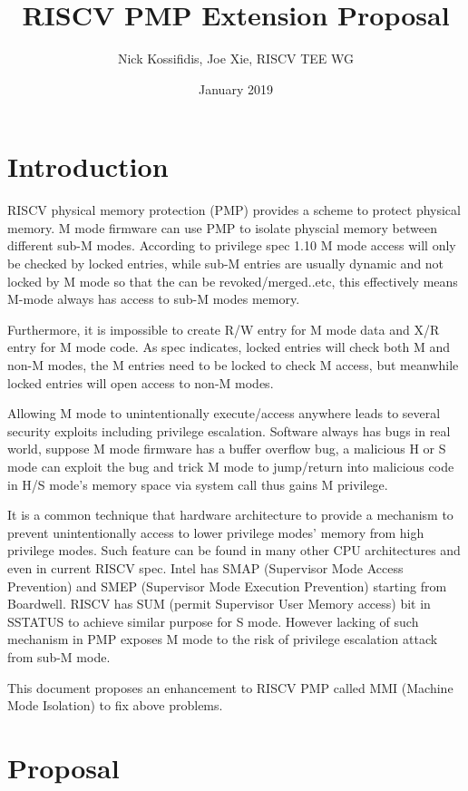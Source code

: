 \documentclass[twoside,11pt]{article}
\title{RISCV PMP Extension Proposal}
\author{Nick Kossifidis, Joe Xie, RISCV TEE WG}
\date{January 2019}
\begin{document}
\maketitle

\section{Introduction}

RISCV physical memory protection (PMP) provides a scheme to protect physical memory. M mode firmware can use PMP to isolate physcial memory between different sub-M modes. According to privilege spec 1.10 M mode access will only be checked by locked entries, while sub-M entries are usually dynamic and not locked by M mode so that the can be revoked/merged..etc, this effectively means M-mode always has access to sub-M modes memory. 

Furthermore, it is impossible to create R/W entry for M mode data and X/R entry for M mode code. As spec indicates, locked entries will check both M and non-M modes, the M entries need to be locked to check M access, but meanwhile locked entries will open access to non-M modes.

Allowing M mode to unintentionally execute/access anywhere leads to several security exploits including privilege escalation. Software always has bugs in real world, suppose M mode firmware has a buffer overflow bug, a malicious H or S mode can exploit the bug and trick M mode to jump/return into malicious code in H/S mode's memory space via system call thus gains M privilege. 

It is a common technique that hardware architecture to provide a mechanism to prevent unintentionally access to lower privilege modes' memory from high privilege modes. Such feature can be found in many other CPU architectures and even in current RISCV spec. Intel has SMAP (Supervisor Mode Access Prevention) and SMEP (Supervisor Mode Execution Prevention) starting from Boardwell. RISCV has SUM (permit Supervisor User Memory access) bit in SSTATUS to achieve similar purpose for S mode. However lacking of such mechanism in PMP exposes M mode to the risk of privilege escalation attack from sub-M mode.

This document proposes an enhancement to RISCV PMP called MMI (Machine Mode Isolation) to fix above problems.

\section{Proposal}
\end{document}
